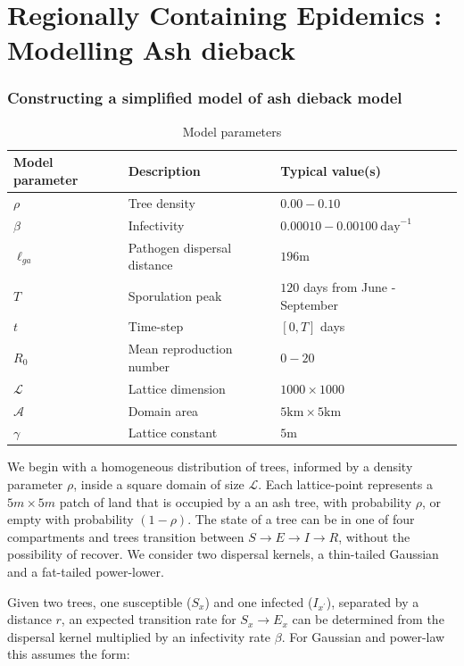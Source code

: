 \chapter{Regionally Containing Epidemics : Modelling Ash dieback}


\subsection{Constructing a simplified model of ash dieback model}

\begin{table}[h]
\centering
\begin{tabular}{l l l}
\hline
\textbf{Model parameter} & \textbf{Description} & \textbf{Typical value(s)}\\
\hline
$\rho$  & Tree density & $0.00 - 0.10$ \\ 
$\beta$ & Infectivity & $0.00010 - 0.00100\ \mathrm{day}^{-1}$ \\
$\ell_{ga}$ & Pathogen dispersal distance & $196\mathrm{m}$ \\
$T$ & Sporulation peak & $120$ days from June - September \\
$t$ & Time-step & $[0, T]$ days\\
$R_0$ & Mean reproduction number & $0-20$ \\
$\mathcal{L}$ & Lattice dimension & $1000\times1000$ \\
$\mathcal{A}$ & Domain area & $5\mathrm{km}\times5\mathrm{km}$ \\
$\gamma$ & Lattice constant & $5\mathrm{m}$ \\
\hline
\end{tabular}
\caption{Model parameters}
\end{table}


We begin with a homogeneous distribution of trees, informed by a density parameter $\rho$, inside a square domain of size $\mathcal{L}$. Each lattice-point represents a $5m\times5m$ patch of land that is occupied by a an ash tree, with probability $\rho$, or empty with probability $(1-\rho)$. The state of a tree can be in one of four compartments and trees transition between $S\rightarrow E \rightarrow I \rightarrow R$, without the possibility of recover. We consider two dispersal kernels, a thin-tailed Gaussian and a fat-tailed power-lower.

Given two trees, one susceptible ($S_x$) and one infected ($I_{x^\prime}$), separated by a distance $r$, an expected transition rate for $S_x \rightarrow E_x$ can be determined from the dispersal kernel multiplied by an infectivity rate $\beta$. For Gaussian and power-law this assumes the form:

